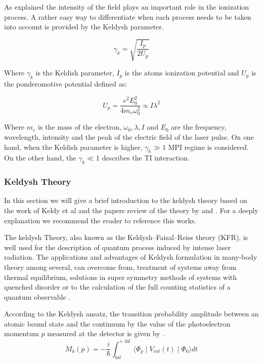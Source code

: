 As explained the intensity of the field plays an important role in the ionization process. A rather easy way to differentiate when each process needs to be taken into account is provided by the Keldysh parameter\cite{keldysh_ionization_1965}.

\begin{equation}
\gamma_{k}=\sqrt{\dfrac{I_{p}}{2U_{p}}}
\end{equation}

Where $\gamma_{k}$ is the Keldish parameter, $I_{p}$ is the atoms ionization potential and $U_{p}$ is the ponderomotive potential defined as:

\begin{equation}
U_{p} = \dfrac{e^{2}E_{0}^{2}}{4m_{e}\omega_{0}^{2}} \propto I \lambda^{2}
\end{equation}

Where $m_{e}$ is the mass of the electron, $\omega_{0}, \lambda, I$ and $E_{0}$ are the frequency, wavelength, intensity and the peak of the electric field of the laser pulse. On one hand, when the Keldish parameter is higher, $\gamma_{k} \gg 1$ MPI regime is considered. On the other hand, the $\gamma_{k} \ll 1$ describes the TI interaction.

\subsubsection{ Keldysh Theory}

In this section we will give a brief introduction to the keldysh theory based on the work of Keldy et al \cite{keldysh_ionization_1965} and the papers review of the theory by \cite{popruzhenko_keldysh_2014} and \cite{karnakov_strong_2009}. For a deeply explanation we recommend the reader to reference this works.

The keldysh Theory, also known as the Keldysh–Faisal–Reiss theory (KFR), is well used for the description of quantum process induced by intense laser radiation. The applications and advantages of Keldysh formulation in many-body theory among  several, can overcome from, treatment of systems away from thermal equilibrium, solutions in  super symmetry methods of systems with quenched disorder or to the  calculation of the full counting statistics of a quantum observable \cite{kamenev_introduction_nodate}.

According to the Keldysh ansatz, the transition probability amplitude between an atomic bound state and the continuum by the value of the photoelectron momentum $p$ measured at the detector is given by \cite{popruzhenko_keldysh_2014}.
 \begin{equation}
 M_{k}(p) = -\dfrac{i}{\hbar} \int_{\inf}^{+\inf} \langle \Phi_{p}\mid  V_{int}(t)\mid \Phi_{0} \rangle dt
 \end{equation}

